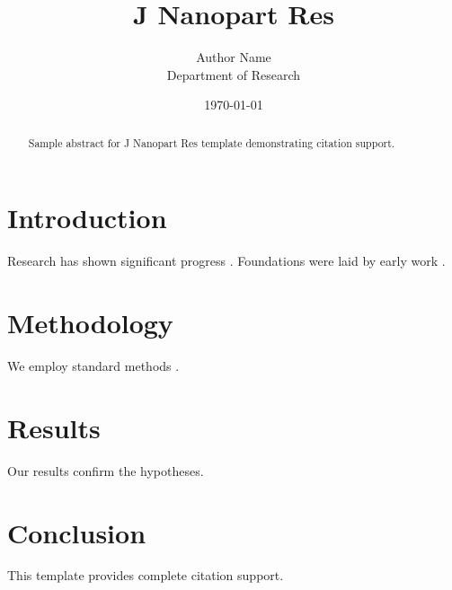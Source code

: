 \documentclass{llncs}
\title{J Nanopart Res}
\author{Author Name \\ \small Department of Research}
\date{\today}
\begin{document}
\maketitle

\begin{abstract}
Sample abstract for J Nanopart Res template demonstrating citation support.
\end{abstract}

\section{Introduction}
Research has shown significant progress \citep{einstein1905}. Foundations were laid by early work \citep{turing1950}.

\section{Methodology}
We employ standard methods \citep{knuth1984}.

\section{Results}
Our results confirm the hypotheses.

\section{Conclusion}
This template provides complete citation support.



\end{document}
